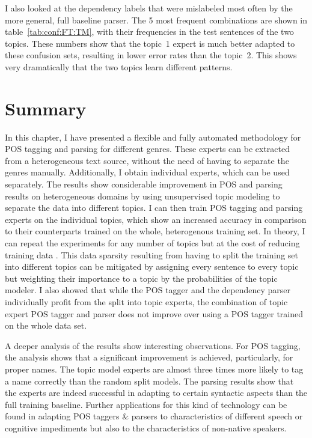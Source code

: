 I also looked at the dependency labels that were mislabeled most often by the more general, full baseline parser. The 5 most frequent combinations are shown in table~\ref{tab:conf:FT:TM}, with their frequencies in the test sentences of the two topics. These numbers show that the topic~1 expert is much better adapted to these confusion sets, resulting in lower error rates than the topic~2. This shows very dramatically that the two topics learn different patterns.

\section{Summary}

In this chapter, I have presented a flexible and fully automated methodology for POS tagging and parsing for different genres. These experts can be extracted from a heterogeneous text source, without the need of having to separate the genres manually. Additionally, I obtain individual experts, which can be used separately. The results show considerable improvement in POS and parsing results on heterogeneous domains by using unsupervised topic modeling to separate the data into different topics. I can then train POS tagging and parsing experts on the individual topics, which show an increased accuracy in comparison to their counterparts trained on the whole, heterogenous training set. In theory, I can repeat the experiments for any number of topics but at the cost of reducing training data . This data sparsity resulting from having to split the training set into different topics can be mitigated by assigning every sentence to every topic but weighting their importance to a topic by the probabilities of the topic modeler. I also showed that while the POS tagger and the dependency parser individually profit from the split into topic experts, the combination of topic expert POS tagger and parser does not improve over using a POS tagger trained on the whole data set. 

A deeper analysis of the results show interesting observations. For POS tagging, the analysis shows that a significant improvement is achieved, particularly, for proper names. The topic model experts are almost three times more likely to tag a name correctly than the random split models. The parsing results show that the experts are indeed successful in adapting to certain syntactic aspects than the full training baseline. Further applications for this kind of technology can be found in adapting POS taggers \& parsers to characteristics of different speech or cognitive impediments but also to the characteristics of non-native speakers. 

